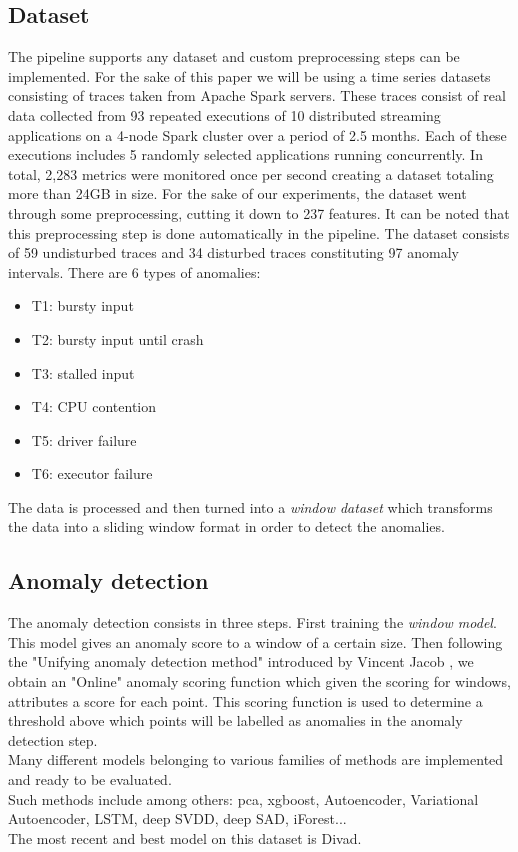 \documentclass[oneside, a4paper, onecolumn, 11pt]{article}
\begin{document}
\subsection{Dataset}
The pipeline supports any dataset and custom preprocessing steps can be implemented. For the sake of this paper we will be using a time series datasets consisting of traces taken from Apache Spark servers. These traces consist of real data collected from 93 repeated executions of 10 distributed streaming applications on a 4-node Spark cluster over a period of 2.5 months. Each of these executions includes 5 randomly selected applications running concurrently. In total, 2,283 metrics were monitored once per second creating a dataset totaling more than 24GB in size. For the sake of our experiments, the dataset went through some preprocessing, cutting it down to 237 features. It can be noted that this preprocessing step is done automatically in the pipeline.
The dataset consists of 59 undisturbed traces and 34 disturbed traces constituting 97 anomaly intervals. There are 6 types of anomalies: 
\begin{itemize}
    \item T1: bursty input 
    \item T2: bursty input until crash
    \item T3: stalled input
    \item T4: CPU contention
    \item T5: driver failure
    \item T6: executor failure
\end{itemize}
The data is processed and then turned into a \textit{window dataset} which transforms the data into a sliding window format in order to detect the anomalies.
\subsection{Anomaly detection}
The anomaly detection consists in three steps. First training the \textit{window model}. This model gives an anomaly score to a window of a certain size. Then following the "Unifying anomaly detection method" introduced by Vincent Jacob \cite{Divad}, we obtain an "Online" anomaly scoring function which given the scoring for windows, attributes a score for each point. This scoring function is used to determine a threshold above which points will be labelled as anomalies in the anomaly detection step.\\
Many different models belonging to various families of methods \cite{Schmidl2022} are implemented and ready to be evaluated.\\
Such methods include among others: pca, xgboost, Autoencoder, Variational Autoencoder, LSTM, deep SVDD, deep SAD, iForest...\\
The most recent and best model on this dataset is Divad.
\end{document}
